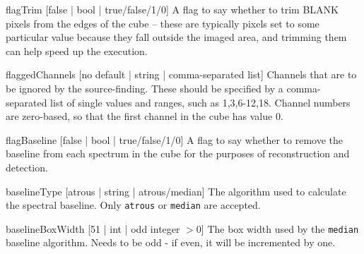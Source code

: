 \begin{Lentry}
\item[{flagTrim [false | bool | true/false/1/0]}] A flag to say
  whether to trim BLANK pixels from the edges of the cube -- these are
  typically pixels set to some particular value because they fall
  outside the imaged area, and trimming them can help speed up the
  execution.
\item[{flaggedChannels [no default | string | comma-separated list]}]
  Channels that are to be ignored by the source-finding. These should
  be specified by a comma-separated list of single values and ranges,
  such as 1,3,6-12,18. Channel numbers are zero-based, so that the
  first channel in the cube has value 0.
\item[{flagBaseline [false | bool | true/false/1/0]}] A flag to say
  whether to remove the baseline from each spectrum in the cube for
  the purposes of reconstruction and detection.
\item[{baselineType [atrous | string | atrous/median]}] The algorithm
  used to calculate the spectral baseline. Only \texttt{atrous} or
  \texttt{median} are accepted.
\item[{baselineBoxWidth [51 | int | odd integer $> 0$]}] The box width
  used by the \texttt{median} baseline algorithm. Needs to be odd - if
  even, it will be incremented by one.
\end{Lentry}


